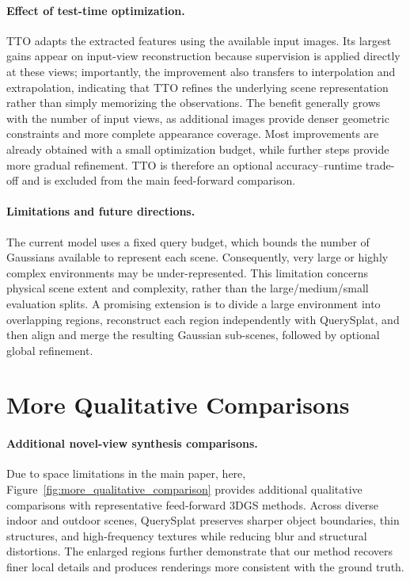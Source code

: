 \paragraph{Effect of test-time optimization.}
TTO adapts the extracted features using the available input images. Its largest gains appear on input-view reconstruction because supervision is applied directly at these views; importantly, the improvement also transfers to interpolation and extrapolation, indicating that TTO refines the underlying scene representation rather than simply memorizing the observations. The benefit generally grows with the number of input views, as additional images provide denser geometric constraints and more complete appearance coverage. Most improvements are already obtained with a small optimization budget, while further steps provide more gradual refinement. TTO is therefore an optional accuracy--runtime trade-off and is excluded from the main feed-forward comparison.

\paragraph{Limitations and future directions.}
The current model uses a fixed query budget, which bounds the number of Gaussians available to represent each scene. Consequently, very large or highly complex environments may be under-represented. This limitation concerns physical scene extent and complexity, rather than the large/medium/small evaluation splits. A promising extension is to divide a large environment into overlapping regions, reconstruct each region independently with QuerySplat, and then align and merge the resulting Gaussian sub-scenes, followed by optional global refinement.












\section{More Qualitative Comparisons}
\label{sec:more_qualitative}

\paragraph{Additional novel-view synthesis comparisons.}
Due to space limitations in the main paper, here, Figure~\ref{fig:more_qualitative_comparison} provides additional qualitative comparisons with representative feed-forward 3DGS methods. Across diverse indoor and outdoor scenes, QuerySplat preserves sharper object boundaries, thin structures, and high-frequency textures while reducing blur and structural distortions. The enlarged regions further demonstrate that our method recovers finer local details and produces renderings more consistent with the ground truth.

